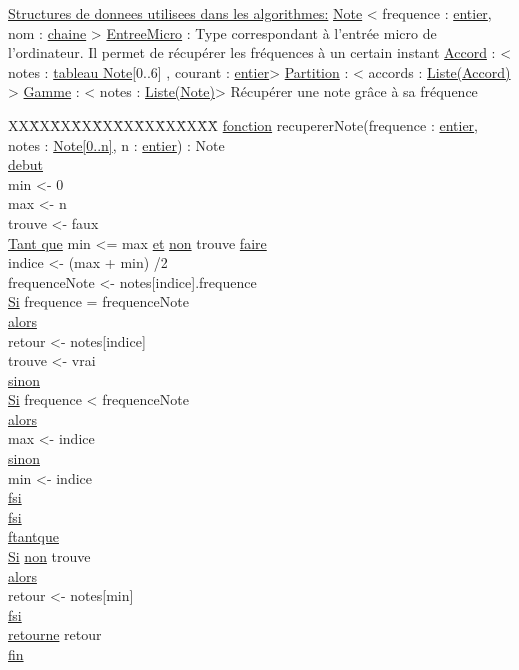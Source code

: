\ul{Structures de donnees utilisees dans les algorithmes:}\newline
\ul{Note} < frequence : \ul{entier}, nom : \ul{chaine} >\newline
\ul{EntreeMicro} : Type correspondant à l'entrée micro de l'ordinateur. Il permet de récupérer les fréquences à un certain instant\newline
\ul{Accord} : < notes : \ul{tableau Note}[0..6] , courant : \ul{entier}>\newline
\ul{Partition} : < accords : \ul{Liste(Accord)} >\newline
\ul{Gamme} : < notes : \ul{Liste(Note)}>\newline
Récupérer une note grâce à sa fréquence\newline
\begin{tabbing}
\kill XX\=XX\=XX\=XX\=XX\=XX\=XX\=XX\=XX\=XX\=
\kill
\ul{fonction} recupererNote(frequence : \ul{entier}, notes : \ul{Note[0..n]}, n : \ul{entier}) : Note\\
\ul{debut}\\
\>min <- 0\\
\>max <- n\\
\>trouve <- faux\\
\>\ul{Tant que} min <= max \ul{et} \ul{non} trouve \ul{faire}\\
    \>\>indice <- (max + min) /2 \\
    \>\>frequenceNote <- notes[indice].frequence\\
    \>\>\ul{Si} frequence = frequenceNote\\
    \>\>\ul{alors}\\
        \>\>\>retour <- notes[indice]\\
        \>\>\>trouve <- vrai\\
    \>\>\ul{sinon}\\
        \>\>\>\ul{Si} frequence < frequenceNote\\
        \>\>\>\ul{alors}\\
            \>\>\>\>max <- indice\\
        \>\>\>\ul{sinon}\\
            \>\>\>\>min <- indice\\
        \>\>\>\ul{fsi}\\
    \>\>\ul{fsi}\\
\>\ul{ftantque}\\
\>\ul{Si} \ul{non} trouve\\
\>\ul{alors}\\
    \>\>retour <- notes[min]\\
\>\ul{fsi}\\
\>\ul{retourne} retour\\
\ul{fin}\\
\end{tabbing}
